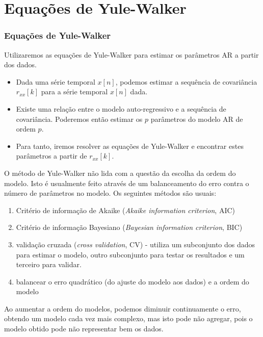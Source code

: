 \section{Equações de Yule-Walker}
\begin{frame}[allowframebreaks]
  \frametitle{Equações de Yule-Walker}
  Utilizaremos as equações de Yule-Walker para estimar os parâmetros AR
  a partir dos dados.
  \begin{itemize}
        \item Dada uma série temporal $x[n]$, podemos estimar a sequência de
        covariância $r_{xx}[k]$ para a série temporal $x[n]$ dada.
        \item Existe uma relação entre o modelo auto-regressivo e a sequência
        de covariância. Poderemos então estimar os $p$ parâmetros do modelo
        AR de ordem $p$.
        \item Para tanto, iremos resolver as equações de Yule-Walker e 
        encontrar estes parâmetros a partir de $r_{xx}[k]$.
  \end{itemize}

  \framebreak
  O método de Yule-Walker não lida com a questão da escolha da ordem do
  modelo. Isto é usualmente feito através de um balanceamento do erro
  contra o número de parâmetros no modelo. Os seguintes métodos
  são usuais:
  \begin{enumerate}
        \item Critério de informação de Akaike (\emph{Akaike information criterion}, AIC)
        \item Critério de informação Bayesiano (\emph{Bayesian information criterion}, BIC)
        \item validação cruzada (\emph{cross validation}, CV) - utiliza
        um subconjunto dos dados para estimar o modelo, outro subconjunto
        para testar os resultados e um terceiro para validar.
        \item balancear o erro quadrático (do ajuste do modelo
  aos dados) e a ordem do modelo
  \end{enumerate}
  Ao aumentar a ordem do modelos, podemos diminuir continuamente o erro,
  obtendo um modelo cada vez mais complexo, mas isto pode não agregar,
  pois o modelo obtido pode não representar bem os dados.
  
  \framebreak
  

\end{frame}
